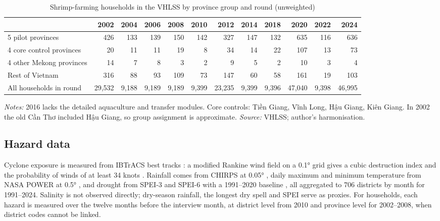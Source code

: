 \documentclass[11pt,a4paper]{article}
\begin{document}
\begin{table}[htbp]
\centering\scriptsize
\caption{Shrimp-farming households in the VHLSS by province group and round (unweighted)}
\label{tab:vhlss_n}
\setlength{\tabcolsep}{3.2pt}
\begin{tabular}{@{}lrrrrrrrrrrr@{}}
\toprule
 & 2002 & 2004 & 2006 & 2008 & 2010 & 2012 & 2014 & 2018 & 2020 & 2022 & 2024 \\
\midrule
5 pilot provinces & 426 & 133 & 139 & 150 & 142 & 327 & 147 & 132 & 635 & 116 & 636 \\
4 core control provinces & 20 & 11 & 11 & 19 & 8 & 34 & 14 & 22 & 107 & 13 & 73 \\
4 other Mekong provinces & 14 & 7 & 8 & 3 & 2 & 9 & 5 & 2 & 10 & 3 & 4 \\
Rest of Vietnam & 316 & 88 & 93 & 109 & 73 & 147 & 60 & 58 & 161 & 19 & 103 \\
\midrule
All households in round & 29,532 & 9,188 & 9,189 & 9,189 & 9,399 & 23,235 & 9,399 & 9,396 & 47,040 & 9,398 & 46,995 \\
\bottomrule
\end{tabular}
\begin{minipage}{\textwidth}\footnotesize
\textit{Notes:} 2016 lacks the detailed aquaculture and transfer modules. Core controls: Tiền Giang, Vĩnh Long, Hậu Giang, Kiên Giang. In 2002 the old Cần Thơ included Hậu Giang, so group assignment is approximate. \textit{Source:} VHLSS; author's harmonisation.
\end{minipage}
\end{table}

\subsection{Hazard data}

Cyclone exposure is measured from IBTrACS best tracks \parencite{knapp2010}: a modified Rankine wind field on a 0.1° grid gives a cubic destruction index and the probability of winds of at least 34 knots \parencite{emanuel2005,strobl2011}. Rainfall comes from CHIRPS at 0.05° \parencite{funk2015}, daily maximum and minimum temperature from NASA POWER at 0.5° \parencite{sparks2018}, and drought from SPEI-3 and SPEI-6 with a 1991--2020 baseline \parencite{vicente2010}, all aggregated to 706 districts by month for 1991--2024. Salinity is not observed directly; dry-season rainfall, the longest dry spell and SPEI serve as proxies. For households, each hazard is measured over the twelve months before the interview month, at district level from 2010 and province level for 2002--2008, when district codes cannot be linked.
\end{document}
